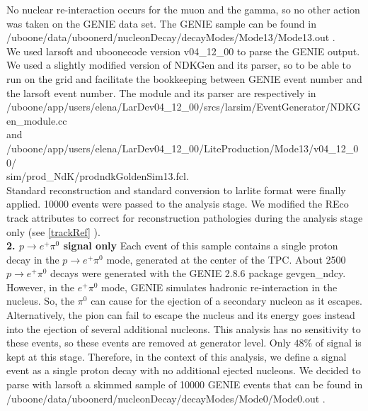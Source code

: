 \documentclass[a4paper, 10pt]{article}
\begin{document}
\noindent No nuclear re-interaction occurs for the muon and the gamma, so no other action was taken on the GENIE data set. The GENIE sample can be found in \\
/uboone/data/uboonerd/nucleonDecay/decayModes/Mode13/Mode13.out .\\
We used larsoft and uboonecode version v04\_12\_00 to parse the GENIE output.
We used a slightly modified version of NDKGen and its parser, so to be able to run on the grid and facilitate the bookkeeping between GENIE event number and the larsoft event number. The module and its parser are respectively in \\
/uboone/app/users/elena/LarDev04\_12\_00/srcs/larsim/EventGenerator/NDKGen\_module.cc \\
and  \\
/uboone/app/users/elena/LarDev04\_12\_00/LiteProduction/Mode13/v04\_12\_00/\\
sim/prod\_NdK/prodndkGoldenSim13.fcl. \\
Standard reconstruction and standard conversion to larlite format were finally applied. 10000 events were passed to the analysis stage. We modified the REco track attributes  to correct for reconstruction pathologies  during the analysis stage  only (see \ref{trackRef} ).\\

{\bf 2. $p \rightarrow e^{+} \pi^{0}$  signal only} Each event of this sample contains a single proton decay in the $p \rightarrow e^{+} \pi^{0}$ mode, generated at the center of the TPC.
About 2500 $p \rightarrow e^{+} \pi^{0}$ decays were generated with the GENIE 2.8.6 package gevgen\_ndcy. However, in the $e^{+} \pi^{0}$ mode, GENIE simulates hadronic re-interaction in the nucleus. So, the $\pi^{0}$ can cause for the ejection of a secondary nucleon as it escapes. Alternatively, the pion can fail to escape the nucleus and its energy goes instead into the ejection of several additional nucleons. This analysis has no sensitivity to these events, so these events are removed at generator level. Only $48\%$ of signal is kept at this stage. Therefore, in the context of this analysis, we define a signal event as a single proton decay with no additional ejected nucleons. We decided to parse with larsoft a skimmed sample of 10000 GENIE events that can be found in \\
/uboone/data/uboonerd/nucleonDecay/decayModes/Mode0/Mode0.out .
\end{document}
